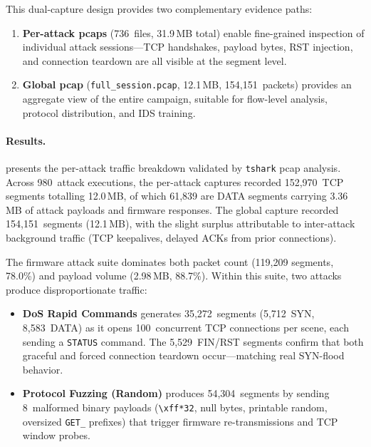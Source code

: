 This dual-capture design provides two complementary evidence paths:
\begin{enumerate}[leftmargin=*]
  \item \textbf{Per-attack pcaps} (736~files, 31.9\,MB total)
    enable fine-grained inspection of individual attack sessions---TCP
    handshakes, payload bytes, RST injection, and connection
    teardown are all visible at the segment level.
  \item \textbf{Global pcap} (\texttt{full\_session.pcap}, 12.1\,MB,
    154{,}151~packets) provides an aggregate view of the entire
    campaign, suitable for flow-level analysis, protocol
    distribution, and IDS training.
\end{enumerate}

\paragraph{Results.}



 presents the per-attack traffic
breakdown validated by \texttt{tshark} pcap analysis.  Across
980~attack executions, the per-attack captures recorded
152{,}970~TCP segments totalling 12.0\,MB, of which 61{,}839
are DATA segments carrying 3.36\,MB of attack payloads and
firmware responses.  The global capture recorded 154{,}151~segments
(12.1\,MB), with the slight surplus attributable to inter-attack
background traffic (TCP keepalives, delayed ACKs from prior
connections).

The firmware attack suite dominates both packet count
(119{,}209 segments, 78.0\%) and payload volume
(2.98\,MB, 88.7\%).  Within this suite, two attacks produce
disproportionate traffic:
\begin{itemize}[leftmargin=*]
  \item \textbf{DoS Rapid Commands} generates 35{,}272~segments
    (5{,}712~SYN, 8{,}583~DATA) as it opens 100~concurrent TCP
    connections per scene, each sending a \texttt{STATUS} command.
    The 5{,}529~FIN/RST segments confirm that both graceful and
    forced connection teardown occur---matching real SYN-flood
    behavior.
  \item \textbf{Protocol Fuzzing (Random)} produces 54{,}304~segments
    by sending 8~malformed binary payloads
    (\texttt{{\textbackslash}xff*32}, null bytes, printable random,
    oversized \texttt{GET\_} prefixes) that trigger firmware
    re-transmissions and TCP window probes.
\end{itemize}

